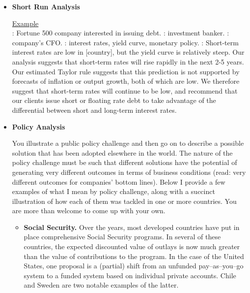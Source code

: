 \documentclass[letterpaper,12pt]{article}
\begin{document}
\begin{itemize}
\item {\bf Short Run Analysis}

\underline{Example} \\
:  Fortune 500 company interested in issuing debt.
:  investment banker.
:  company's CFO.
:  interest rates, yield curve, monetary policy.
:  Short-term interest rates are low in [country], but the yield curve is relatively steep.
Our analysis suggests that short-term rates will rise rapidly 
in the next 2-5 years.
Our estimated Taylor rule suggests that this prediction is not supported by forecasts of inflation or output growth,
both of which are low.  We therefore suggest that short-term rates will continue to be low,
and recommend that our clients issue short or floating rate debt to take advantage of the differential between
short and long-term interest rates.


\item {\bf Policy Analysis} 

You illustrate a public policy challenge and then go on to describe
a possible solution that has been adopted elsewhere in the world. 
The nature of the policy
challenge must be such that different solutions have the potential
of generating very different outcomes in terms of business
conditions (read: very different outcomes for companies' bottom
lines). Below I provide a few examples of what I mean by policy
challenge, along with a succinct illustration of how each of them
was tackled in one or more countries. 
You are more than welcome to come up with your own.

\begin{itemize}

\item {\bf Social Security.} Over the years, most developed countries have put in place
comprehensive Social Security programs. In several of these
countries, the expected discounted value of outlays is now much
greater than the value of contributions to the program. In the case
of the United States, one proposal is a (partial) shift from 
an unfunded pay--as--you--go system to a funded system based on 
individual private accounts.  Chile and Sweden are two notable examples of
the latter.  



\end{itemize}
\end{itemize}
\end{document}

